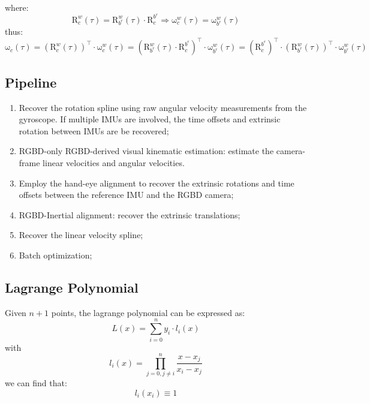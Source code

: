 \documentclass[12pt, onecolumn]{article}
\newcommand\bsm[1]{\boldsymbol{\mathrm{#1}}}
\newcommand\rotation[2]{{\bsm{R}_{#1}^{#2}}}
\newcommand\angvel[2]{{\bsm{\omega}_{#1}^{#2}}}
\begin{document}
	where:
	\begin{equation}
	\rotation{c}{w}(\tau)=\rotation{b^r}{w}(\tau)\cdot\rotation{c}{b^r}
	\Rightarrow
	\angvel{c}{w}(\tau)=\angvel{b^r}{w}(\tau)
	\end{equation}
	thus:
	\begin{equation}
	\bsm{\omega}_c(\tau)=\left( \rotation{c}{w}(\tau)\right)^\top\cdot\angvel{c}{w}(\tau)=\left( 
	\rotation{b^r}{w}(\tau)\cdot\rotation{c}{b^r}\right)^\top \cdot\angvel{b^r}{w}(\tau)=\left( 
		\rotation{c}{b^r}\right)^\top \cdot\left( 
				\rotation{b^r}{w}(\tau)\right)^\top \cdot\angvel{b^r}{w}(\tau)
	\end{equation}
	
	\subsection{Pipeline}
	\begin{enumerate}
	\item Recover the rotation spline using raw angular velocity measurements from the gyroscope. If multiple IMUs are involved, the time offsets and extrinsic rotation between IMUs are be recovered;
	
	\item RGBD-only RGBD-derived visual kinematic estimation: estimate the camera-frame linear velocities and angular velocities.
	
	\item Employ the hand-eye alignment to recover the extrinsic rotations and time offsets between the reference IMU and the RGBD camera;
	
	\item RGBD-Inertial alignment: recover the extrinsic translations;
	
	\item Recover the linear velocity spline;
	
	\item Batch optimization;
	\end{enumerate}
	
	\subsection{Lagrange Polynomial}
	Given $n+1$ points, the lagrange polynomial can be expressed as:
	\begin{equation}
	L(x)=\sum_{i=0}^{n}y_i\cdot l_i(x)
	\end{equation}
	with
	\begin{equation}
	l_i(x)=\prod_{j=0,j\ne i}^{n}\frac{x-x_j}{x_i-x_j}
	\end{equation}
	we can find that:
	\begin{equation}
	l_i(x_i)\equiv 1
	\end{equation}
	
\end{document}
